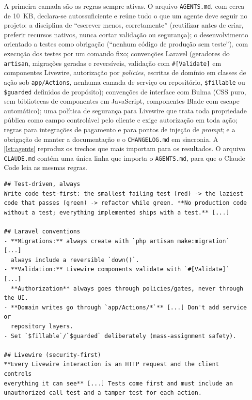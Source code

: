A primeira camada são as regras sempre ativas. O arquivo \texttt{AGENTS.md}, com
cerca de 10~KB, declara-se autossuficiente e reúne tudo o que um agente deve
seguir no projeto: a disciplina de ``escrever menos, corretamente'' (reutilizar
antes de criar, preferir recursos nativos, nunca cortar validação ou
segurança); o desenvolvimento orientado a testes como obrigação
(``nenhum código de produção sem teste''), com execução dos testes por um
comando fixo; convenções Laravel (geradores do \texttt{artisan}, migrações
geradas e reversíveis, validação com \texttt{\#[Validate]} em componentes
Livewire, autorização por \textit{policies}, escritas de domínio em classes de
ação sob \texttt{app/Actions}, nenhuma camada de serviço ou repositório,
\texttt{\$fillable} ou \texttt{\$guarded} definidos de propósito); convenções
de interface com Bulma (CSS puro, sem bibliotecas de componentes em
JavaScript, componentes Blade com escape automático); uma política de
segurança para Livewire que trata toda propriedade pública como campo
controlável pelo cliente e exige autorização em toda ação; regras para
integrações de pagamento e para pontos de injeção de \textit{prompt}; e a
obrigação de manter a documentação e o \texttt{CHANGELOG.md} em sincronia. A
\autoref{lst:agents} reproduz os trechos que mais importam para os resultados.
O arquivo \texttt{CLAUDE.md} contém uma única linha que importa o
\texttt{AGENTS.md}, para que o Claude Code leia as mesmas regras.

\begin{lstlisting}[float=htb, caption={Trechos normativos do \texttt{AGENTS.md} do \textit{harness} v1 (regra de testes, convenções Laravel e política Livewire)}, label={lst:agents}, basicstyle=\ttfamily\footnotesize, numbers=none]
## Test-driven, always
Write code test-first: the smallest failing test (red) -> the laziest
code that passes (green) -> refactor while green. **No production code
without a test; everything implemented ships with a test.** [...]

## Laravel conventions
- **Migrations:** always create with `php artisan make:migration` [...]
  always include a reversible `down()`.
- **Validation:** Livewire components validate with `#[Validate]` [...]
  **Authorization** always goes through policies/gates, never through the UI.
- **Domain writes go through `app/Actions/*`** [...] Don't add service or
  repository layers.
- Set `$fillable`/`$guarded` deliberately (mass-assignment safety).

## Livewire (security-first)
**Every Livewire interaction is an HTTP request and the client controls
everything it can see** [...] Tests come first and must include an
unauthorized-call test and a tamper test for each action.
\end{lstlisting}

